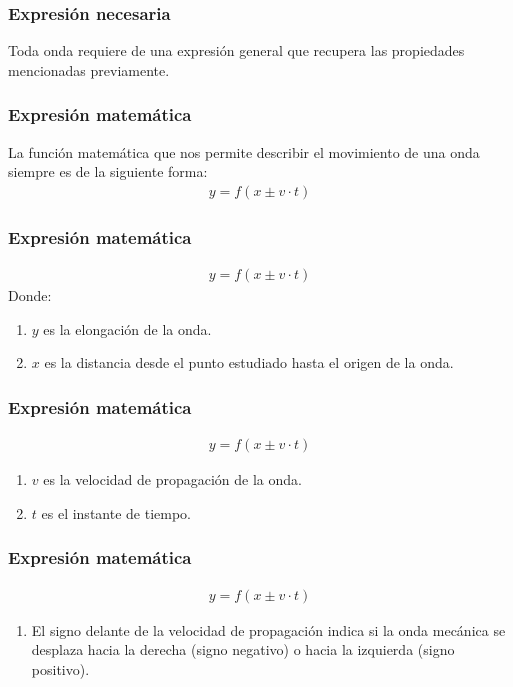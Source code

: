 \documentclass[14pt]{beamer}
\begin{document}
\begin{frame}
\frametitle{Expresión necesaria}
Toda onda requiere de una expresión general que recupera las propiedades mencionadas previamente.
\end{frame}
\begin{frame}
\frametitle{Expresión matemática}
La función matemática que nos permite describir el movimiento de una onda siempre es de la siguiente forma:
\pause
\begin{align*}
y = f (x \pm v \cdot t)
\end{align*}
\end{frame}
\begin{frame}
\frametitle{Expresión matemática}
\begin{align*}
y = f (x \pm v \cdot t)
\end{align*}
Donde:
\begin{enumerate}[<+->]
\item $y$ es la elongación de la onda.
\item $x$ es la distancia desde el punto estudiado hasta el origen de la onda.
\seti
\end{enumerate}
\end{frame}
\begin{frame}
\frametitle{Expresión matemática}
\begin{align*}
y = f (x \pm v \cdot t)
\end{align*}
\begin{enumerate}[<+->]
\conti
\item $v$ es la velocidad de propagación de la onda.
\item $t$ es el instante de tiempo.
\seti
\end{enumerate}
\end{frame}
\begin{frame}
\frametitle{Expresión matemática}
\begin{align*}
y = f (x \pm v \cdot t)
\end{align*}
\begin{enumerate}[<+->]
\conti
\item El signo delante de la velocidad de propagación indica si la onda mecánica se desplaza hacia la derecha (signo negativo) o hacia la izquierda (signo positivo).
\end{enumerate}
\end{frame}
\end{document}
